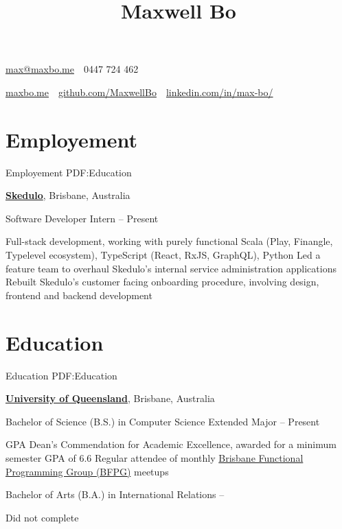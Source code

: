 \documentclass[a4paper,10pt,oneside]{article}
\begin{document}

\title{Maxwell Bo}

\begin{subtitle}
\par \href{mailto:max@maxbo.me}{max@maxbo.me} \,\BulletSymbol\, 0447 724 462

\par \href{http://maxbo.me/}{maxbo.me} 
\,\BulletSymbol\, 
\href{https://github.com/MaxwellBo}{github.com/MaxwellBo}
\,\BulletSymbol\, 
\href{https://www.linkedin.com/in/max-bo/}{linkedin.com/in/max-bo/}

\end{subtitle}

\begin{body}


\section
{Employement}
{Employement}
{PDF:Education}

\href{https://skedulo.com/}{\textbf{Skedulo}}, Brisbane, Australia
\par Software Developer Intern\hfill {} -- Present 
\begin{detail}
	\BulletItem Full-stack development, working with purely functional Scala (Play, Finangle, Typelevel ecosystem),\newline
	TypeScript (React, RxJS, GraphQL), Python
	\BulletItem Led a feature team to overhaul Skedulo's internal service administration applications
	\BulletItem Rebuilt Skedulo's customer facing onboarding procedure, involving design, frontend and backend development
\end{detail}


\section
{Education}
{Education}
{PDF:Education}

\href{https://www.uq.edu.au/}{\textbf{University of Queensland}}, Brisbane, Australia
\par Bachelor of Science (B.S.) in Computer Science Extended Major\hfill {} -- Present
\begin{detail}
 GPA
\BulletItem Dean's Commendation for Academic Excellence, awarded for a minimum semester GPA of 6.6
\BulletItem Regular attendee of monthly \href{https://www.meetup.com/en-AU/Brisbane-Functional-Programming-Group/}{Brisbane Functional Programming Group (BFPG)} meetups
\end{detail}
\par Bachelor of Arts (B.A.) in International Relations\hfill {} -- 
\begin{detail}
Did not complete
\end{detail}


\end{body}
\end{document}
